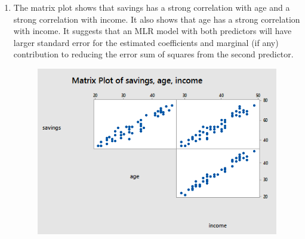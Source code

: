 \documentclass{article}
\providecommand{\tightlist}{%
      \setlength{\itemsep}{0pt}\setlength{\parskip}{0pt}}
\begin{document}
\begin{enumerate}
\def\labelenumi{\alph{enumi})}
\tightlist
\item
  The matrix plot shows that savings has a strong correlation with age
  and a strong correlation with income. It also shows that age has a
  strong correlation with income. It suggests that an MLR model with
  both predictors will have larger standard error for the estimated
  coefficients and marginal (if any) contribution to reducing the error
  sum of squares from the second predictor.
  
  \begin{figure}[h!]
 \centering
 \includegraphics[scale=.5]{./images/matrix-plot_savings-age-income.png}
\end{figure}

\end{enumerate}
\end{document}
